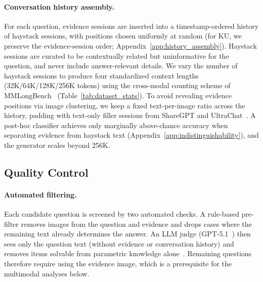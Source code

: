 \documentclass{article}
\begin{document}
\paragraph{Conversation history assembly.}
For each question, evidence sessions are inserted into a timestamp-ordered history of haystack sessions, with positions chosen uniformly at random (for KU, we preserve the evidence-session order; Appendix~\ref{app:history_assembly}). Haystack sessions are curated to be contextually related but uninformative for the question, and never include answer-relevant details. We vary the number of haystack sessions to produce four standardized context lengths (32K/64K/128K/256K tokens) using the cross-modal counting scheme of MMLongBench~\cite{mmlongbench} (Table~\ref{tab:dataset_stats}). To avoid revealing evidence positions via image clustering, we keep a fixed text-per-image ratio across the history, padding with text-only filler sessions from ShareGPT and UltraChat~\cite{ding2023enhancing}. A post-hoc classifier achieves only marginally above-chance accuracy when separating evidence from haystack text (Appendix~\ref{app:indistinguishability}), and the generator scales beyond 256K.



\subsection{Quality Control}
\label{subsec:quality_control}

\paragraph{Automated filtering.}
Each candidate question is screened by two automated checks. A rule-based pre-filter removes images from the question and evidence and drops cases where the remaining text already determines the answer. An LLM judge (GPT-5.1~\citep{singh2025openaigpt5card}) then sees only the question text (without evidence or conversation history) and removes items solvable from parametric knowledge alone~\cite{mallen2023not}. Remaining questions therefore require using the evidence image, which is a prerequisite for the multimodal analyses below.
\end{document}

